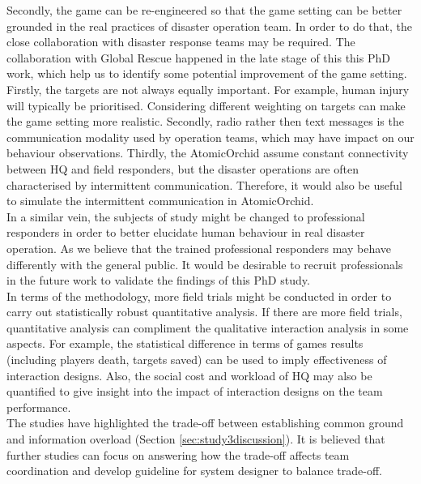 Secondly, the game can be re-engineered so that the game setting can be better grounded in the real practices of disaster operation team. In order to do that, the close collaboration with disaster response teams may be required. The collaboration with Global Rescue happened in the late stage of this this PhD work, which help us to identify some potential improvement of the game setting. Firstly, the targets are not always equally important. For example, human injury will typically be prioritised. Considering different weighting on targets can make the game setting more realistic. Secondly, radio rather then text messages is the communication modality used by operation teams, which may have impact on our behaviour observations. Thirdly, the AtomicOrchid assume constant connectivity between HQ and field responders, but the disaster operations are often characterised by intermittent communication. Therefore, it would also be useful to simulate the intermittent communication in AtomicOrchid.  \\

In a similar vein, the subjects of study might be changed to professional responders in order to better elucidate human behaviour in real disaster operation.  As we believe that the trained professional responders may behave differently with the general public. It would be desirable to recruit professionals in the future work to validate the findings of this PhD study.\\

In terms of the methodology, more field trials might be conducted in order to carry out statistically robust quantitative analysis. If there are more field trials, quantitative analysis can compliment the qualitative interaction analysis in some aspects. For example, the statistical difference in terms of games results (including players death, targets saved) can be used to imply effectiveness of interaction designs. Also, the social cost and workload of HQ may also be quantified  to give insight into the impact of interaction designs on the team performance. \\ %

The studies have highlighted the trade-off between establishing common ground and information overload (Section \ref{sec:study3discussion}). It is believed that further studies can focus on answering how the trade-off affects team coordination and develop guideline for system designer to balance trade-off. \\  

